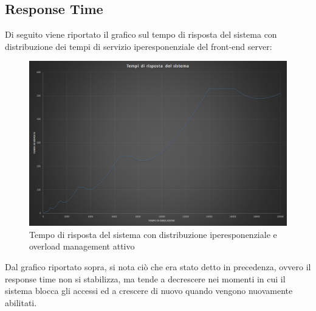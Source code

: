 \subsection{Response Time}

Di seguito viene riportato il grafico sul tempo di risposta del sistema con 
distribuzione dei 
tempi di servizio iperesponenziale del front-end server:

\begin{figure}[H]
 \centering
 \includegraphics[scale=0.45]{img/responseOM.png}
 \caption[Tempo di risposta del sistema con distribuzione iperesponenziale e 
overload management attivo]{Tempo di risposta del sistema con distribuzione 
iperesponenziale e overload management attivo}
 \label{fig:Tempo di risposta del sistema con distribuzione iperesponenziale e 
overload management attivo}
\end{figure}

Dal grafico riportato sopra, si nota ci\`o che era stato detto in precedenza, 
ovvero il response time
non si stabilizza, ma tende a decrescere nei momenti in cui il sistema blocca 
gli accessi ed a crescere di 
nuovo quando vengono nuovamente abilitati.

